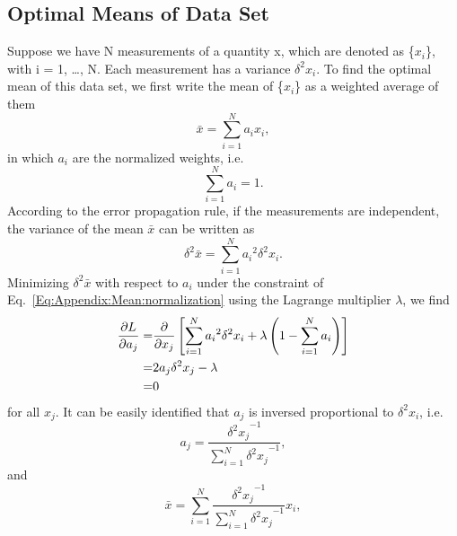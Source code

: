 \begin{appendices}
\chapter{Optimal Means of Data Set\label{chapter:Appendix:Mean}}
Suppose we have N measurements of a quantity x, which are denoted as \{$x_i$\}, with i = 1, \dots, N. Each measurement has a variance $\delta^2 x_i$. To find the optimal mean of this data set, we first write the mean of \{$x_i$\} as a weighted average of them
\begin{equation}
\bar{x}=\sum\limits_{i=1}^N a_i x_i,
\label{Eq:Appendix:Mean:mean}
\end{equation}
in which $a_i$ are the normalized weights, i.e.
\begin{equation}
\sum\limits_{i=1}^Na_i=1.
\label{Eq:Appendix:Mean:normalization}
\end{equation} 
According to the error propagation rule, if the measurements are independent, the variance of the mean $\bar{x}$ can be written as
\begin{equation}
\delta^2\bar{x}=\sum\limits_{i=1}^N{a_i}^2\delta^2x_i.
\label{Eq:Appendix:Mean:variaceofmean}
\end{equation}
Minimizing $\delta^2\bar{x}$ with respect to $a_i$ under the constraint of Eq.~\ref{Eq:Appendix:Mean:normalization} using the Lagrange multiplier $\lambda$, we find
\begin{align}
\frac{\partial L}{\partial a_j}=&\frac{\partial}{\partial x_j}\left[\sum\limits_{i=1}^{N}{a_i}^2\delta^2x_i+\lambda\left(1-\sum\limits_{i=1}^Na_i\right)\right]\notag\\
=&2a_j\delta^2x_j-\lambda\notag\\
=&0
\end{align}
for all {$x_j$}. It can be easily identified that $a_j$ is inversed proportional to $\delta^2x_i$, i.e.
\begin{equation}
a_j=\frac{{\delta^2x_j}^{-1}}{\sum\limits_{i=1}^N {\delta^2x_j}^{-1}},
\label{Eq:Appendix:Mean:aj}
\end{equation}
and
\begin{equation}
\bar{x}=\sum\limits_{i=1}^N \frac{{\delta^2x_j}^{-1}}{\sum\limits_{i=1}^N {\delta^2x_j}^{-1}} x_i,
\label{Eq:Appendix:Mean:meanexpanded}
\end{equation}



\end{appendices}
